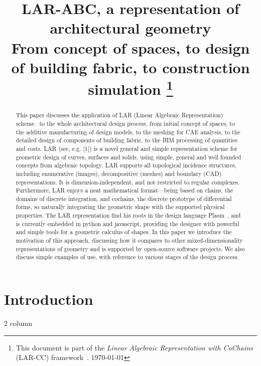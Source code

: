 \documentclass[11pt,oneside]{article}	%
\title{LAR-ABC, a representation of architectural geometry \\
{\Large From concept of spaces, to design of building fabric, to construction simulation}
\footnote{This document is part of the \emph{Linear Algebraic Representation with CoChains} (LAR-CC) framework~\cite{cclar-proj:2013:00}. \today}
}
\begin{document}
\maketitle
\nonstopmode

\begin{abstract}
This paper discusses the application of LAR (Linear Algebraic Representation) scheme~\cite{Dicarlo:2014:TNL:2543138.2543294} to the whole architectural design process, from initial concept of spaces, to the additive manufacturing of design models, to the meshing for CAE analysis, to the detailed design of components of building fabric, to the BIM processing of quantities and costs. LAR (see, e.g. [1]) is a novel general and simple representation scheme for geometric design of curves, surfaces and solids, using simple, general and well founded concepts from algebraic topology. 
LAR supports all topological incidence structures, including enumerative (images), decompositive (meshes) and boundary (CAD) representations. It is dimension-independent, and not restricted to regular complexes. Furthermore, LAR enjoys a neat mathematical format—being based on chains, the domains of discrete integration, and cochains, the discrete prototype of differential forms, so naturally integrating the geometric shape with the supported physical properties. 
The LAR representation find his roots in the design language Plasm~\cite{Paoluzzi2003a}, and is currently embedded in python and javascript, providing the designer with powerful and simple tools for a geometric calculus of shapes. In this paper we introduce the motivation of this approach, discussing how it compares to other mixed-dimensionality representations of geometry and is supported by open-source software projects. We also discuss simple examples of use, with reference to various stages of the design process.
\end{abstract}

\newpage
\tableofcontents
\newpage

\section{Introduction}
2 column
\end{document}
